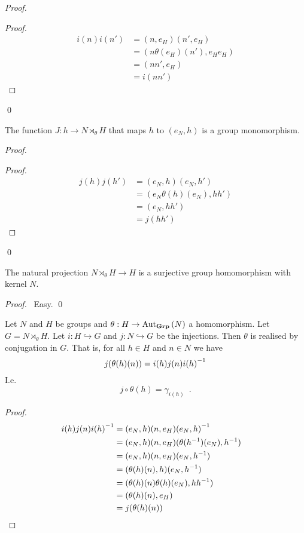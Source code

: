\begin{proof}
\pf
{}
\begin{proof}
	\pf
	\begin{align*}
		i(n)i(n') & = (n,e_H)(n',e_H) \\
		& = (n \theta(e_H)(n'), e_H e_H) \\
		& = (nn',e_H) \\
		& = i(nn')
	\end{align*}
\end{proof}
\qed
\end{proof}

\begin{prop}
The function $J : h \rightarrow N \rtimes_\theta H$ that maps $h$ to $(e_N,h)$ is a group monomorphism.
\end{prop}

\begin{proof}
\pf
{}
\begin{proof}
	\pf
	\begin{align*}
		j(h)j(h') & = (e_N,h)(e_N,h') \\
		& = (e_N \theta(h)(e_N), hh') \\
		& = (e_N, hh') \\
		& = j(hh')
	\end{align*}
\end{proof}
\qed
\end{proof}

\begin{prop}
The natural projection $N \rtimes_\theta H \rightarrow H$ is a surjective group homomorphism with kernel $N$.
\end{prop}

\begin{proof}
\pf\ Easy. \qed
\end{proof}

\begin{prop}
Let $N$ and $H$ be groups and $\theta : H \rightarrow \mathrm{Aut}_{\mathbf{Grp}} \left( {N} \right)$ a homomorphism. Let $G = N \rtimes_\theta H$. Let $i : H \hookrightarrow G$ and $j : N \hookrightarrow G$ be the injections. Then $\theta$ is realised by conjugation in $G$. That is, for all $h \in H$ and $n \in N$ we have
\[ j(\theta(h)(n)) = i(h) j(n) {i(h)}^{-1} \]
I.e.
\[ j \circ \theta(h) = \gamma_{i(h)} \enspace . \]
\end{prop}

\begin{proof}
\pf
\begin{align*}
	i(h) j(n) {i(h)}^{-1} & = (e_N,h)(n,e_H){(e_N,h)}^{-1} \\
	& = (e_N,h)(n,e_H)(\theta({h}^{-1})(e_N),{h}^{-1})\\
	& = (e_N,h)(n,e_H)(e_N,{h}^{-1}) \\
	& = (\theta(h)(n),h)(e_N,{h}^{-1}) \\
	& = (\theta(h)(n)\theta(h)(e_N),h {h}^{-1}) \\
	& = (\theta(h)(n), e_H) \\
	& = j(\theta(h)(n)) & \relax
\end{align*}
\end{proof}

